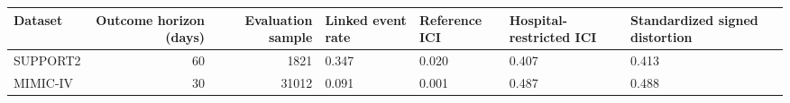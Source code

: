 \begin{tabular}{lrrllll}
\toprule
Dataset & Outcome horizon (days) & Evaluation sample & Linked event rate & Reference ICI & Hospital-restricted ICI & Standardized signed distortion \\
\midrule
SUPPORT2 & 60 & 1821 & 0.347 & 0.020 & 0.407 & 0.413 \\
MIMIC-IV & 30 & 31012 & 0.091 & 0.001 & 0.487 & 0.488 \\
\bottomrule
\end{tabular}

